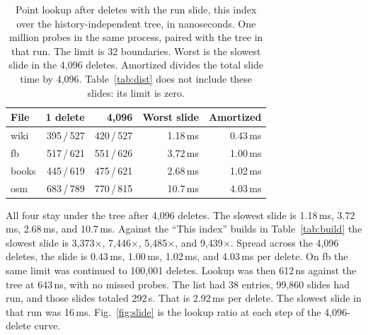 \documentclass[conference]{IEEEtran}
\begin{document}
\begin{table}[t]
\caption{Point lookup after deletes with the run slide, this index over the history-independent tree, in nanoseconds.
One million probes in the same process, paired with the tree in that run.
The limit is 32 boundaries.
Worst is the slowest slide in the 4{,}096 deletes.
Amortized divides the total slide time by 4{,}096.
Table~\ref{tab:dist} does not include these slides: its limit is zero.}
\label{tab:compact}
\centering
\scriptsize
\begin{tabular}{@{}lrrrr@{}}
\toprule
File & 1 delete & 4{,}096 & Worst slide & Amortized \\
\midrule
wiki  & 395\,/\,527 & 420\,/\,527 & 1.18\,ms & 0.43\,ms \\
fb    & 517\,/\,621 & 551\,/\,626 & 3.72\,ms & 1.00\,ms \\
books & 445\,/\,619 & 475\,/\,621 & 2.68\,ms & 1.02\,ms \\
osm   & 683\,/\,789 & 770\,/\,815 & 10.7\,ms & 4.03\,ms \\
\bottomrule
\end{tabular}
\end{table}

All four stay under the tree after 4{,}096 deletes.
The slowest slide is 1.18\,ms, 3.72\,ms, 2.68\,ms, and 10.7\,ms.
Against the ``This index'' builds in Table~\ref{tab:build} the slowest slide is 3{,}373$\times$, 7{,}446$\times$, 5{,}485$\times$, and 9{,}439$\times$.
Spread across the 4{,}096 deletes, the slide is 0.43\,ms, 1.00\,ms, 1.02\,ms, and 4.03\,ms per delete.
On fb the same limit was continued to 100{,}001 deletes.
Lookup was then 612\,ns against the tree at 643\,ns, with no missed probes.
The list had 38 entries, 99{,}860 slides had run, and those slides totaled 292\,s.
That is 2.92\,ms per delete.
The slowest slide in that run was 16\,ms.
Fig.~\ref{fig:slide} is the lookup ratio at each step of the 4{,}096-delete curve.
\end{document}
